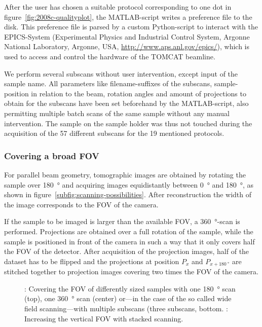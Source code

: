 After the user has chosen a suitable protocol corresponding to one dot in figure~\ref{fig:2008c-qualityplot}, the MATLAB-script writes a preference file to the disk. This preference file is parsed by a custom Python-script to interact with the EPICS-System (Experimental Physics and Industrial Control System, Argonne National Laboratory, Argonne, USA, \url{http://www.aps.anl.gov/epics/}), which is used to access and control the hardware of the TOMCAT beamline.

We perform several subscans without user intervention, except input of the sample name. All parameters like filename-suffixes of the subscans, sample-position in relation to the beam, rotation angles and amount of projections to obtain for the subscans have been set beforehand by the MATLAB-script, also permitting multiple batch scans of the same sample without any manual intervention. The sample on the sample holder was thus not touched during the acquisition of the 57 different subscans for the 19 mentioned protocols. 

\subsubsection{Covering a broad FOV}
\label{subsec:covering a broad fov}
For parallel beam geometry, tomographic images are obtained by rotating the sample over \SI{180}{\degree} and acquiring images equidistantly between \SI{0}{\degree} and \SI{180}{\degree}, as shown in figure~\ref{subfig:scanning-possibilities}. After reconstruction the width of the image corresponds to the FOV of the camera.

If the sample to be imaged is larger than the available FOV, a \SI{360}{\degree}-scan is performed. Projections are obtained over a full rotation of the sample, while the sample is positioned in front of the camera in such a way that it only covers half the FOV of the detector. After acquisition of the projection images, half of the dataset has to be flipped and the projections at position $P_{x}$ and $P_{x+\SI{180}{\degree}}$ are stitched together to projection images covering two times the FOV of the camera.

\begin{figure*}
	\noindent{}%
	\caption[Covering the FOV of differently sized samples]{: Covering the FOV of differently sized samples with one \SI{180}{\degree} scan (top), one \SI{360}{\degree} scan (center) or---in the case of the so called wide field scanning---with multiple subscans (three subscans, bottom. : Increasing the vertical FOV with stacked scanning.
	}%
	\label{fig:scanning-possibilities}%
\end{figure*}

